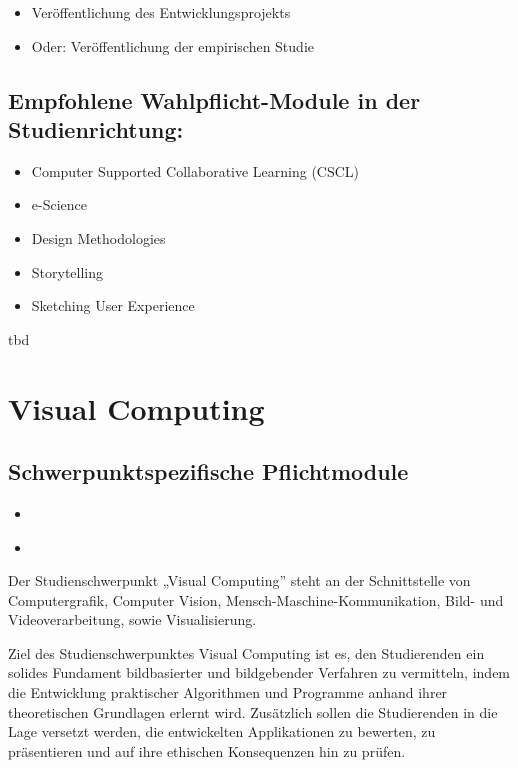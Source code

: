 \begin{itemize}
\item
  Veröffentlichung des Entwicklungsprojekts
\item
  Oder: Veröffentlichung der empirischen Studie
\end{itemize}

\section*{Empfohlene Wahlpflicht-Module in der
Studienrichtung:}\label{empfohlene-wahlpflicht-module-in-der-studienrichtung}

\begin{itemize}
\item
  Computer Supported Collaborative Learning (CSCL)
\item
  e-Science
\item
  Design Methodologies
\item
  Storytelling
\item
  Sketching User Experience
\end{itemize}

tbd

\chapter{Visual Computing}\label{visual-computing}

\section*{Schwerpunktspezifische
Pflichtmodule}\label{schwerpunktspezifische-pflichtmodule-3}

\begin{itemize}
\item
  ​
\item
  ​
\end{itemize}

Der Studienschwerpunkt „Visual Computing'' steht an der Schnittstelle
von Computergrafik, Computer Vision, Mensch-Maschine-Kommunikation,
Bild- und Videoverarbeitung, sowie Visualisierung.

Ziel des Studienschwerpunktes Visual Computing ist es, den Studierenden
ein solides Fundament bildbasierter und bildgebender Verfahren zu
vermitteln, indem die Entwicklung praktischer Algorithmen und Programme
anhand ihrer theoretischen Grundlagen erlernt wird. Zusätzlich sollen
die Studierenden in die Lage versetzt werden, die entwickelten
Applikationen zu bewerten, zu präsentieren und auf ihre ethischen
Konsequenzen hin zu prüfen.


